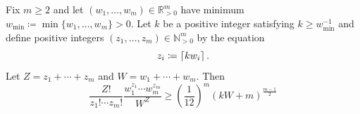 \documentclass[notitlepage, 10pt]{article}
\begin{document}
\begin{lem}
    \label{lem:multinomial_dist_lower_bound}
    Fix $m\geq 2$ and let $(w_1, \ldots, w_m) \in \mathbb R_{> 0}^{m}$ have minimum $w_{\min} \coloneqq \min\{ w_1, \ldots, w_m\} > 0$.
    Let $k$ be a positive integer satisfying $k \geq w_{\min}^{-1}$ and define positive integers $(z_1, \ldots, z_m) \in \mathbb N_{>0}^{m}$ by the equation
    \begin{equation}
        z_{i} \coloneqq \left\lceil kw_{i}\right\rceil.
    \end{equation}
    Let $Z = z_1+\cdots+z_m$ and $W = w_1 + \cdots + w_m$.
    Then
    \begin{equation}
        \label{eq:multinomial_dist_lower_bound}
        \frac{Z!}{z_1! \cdots z_m!}\frac{w_1^{z_{1}}\cdots w_{m}^{z_{m}}}{W^{Z}} \geq \left(\frac{1}{12}\right)^{m}(kW + m)^{\frac{m-1}{2}}
    \end{equation}
\end{lem}
\end{document}
